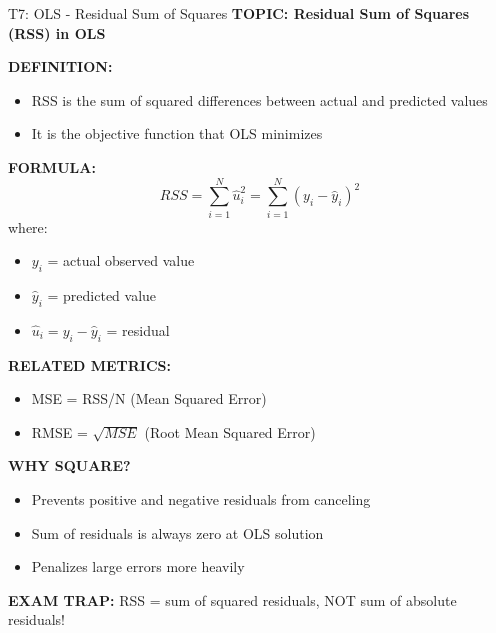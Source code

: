 \documentclass[8pt]{beamer}
\begin{document}
	\begin{frame}{T7: OLS - Residual Sum of Squares}
		\fontsize{6.5}{7.5}\selectfont
		\textbf{TOPIC: Residual Sum of Squares (RSS) in OLS}
		
		\vspace{0.1cm}
		\textbf{DEFINITION:}
		\begin{itemize}
			\item RSS is the sum of squared differences between actual and predicted values
			\item It is the objective function that OLS minimizes
		\end{itemize}
		
		\vspace{0.1cm}
		\textbf{FORMULA:}
		\[
		RSS = \sum_{i=1}^N \hat{u}_i^2 = \sum_{i=1}^N (y_i - \hat{y}_i)^2
		\]
		where:
		\begin{itemize}
			\item $y_i$ = actual observed value
			\item $\hat{y}_i$ = predicted value
			\item $\hat{u}_i = y_i - \hat{y}_i$ = residual
		\end{itemize}
		
		\vspace{0.1cm}
		\textbf{RELATED METRICS:}
		\begin{itemize}
			\item MSE = RSS/N (Mean Squared Error)
			\item RMSE = $\sqrt{MSE}$ (Root Mean Squared Error)
		\end{itemize}
		
		\vspace{0.1cm}
		\textbf{WHY SQUARE?}
		\begin{itemize}
			\item Prevents positive and negative residuals from canceling
			\item Sum of residuals is always zero at OLS solution
			\item Penalizes large errors more heavily
		\end{itemize}
		
		\textcolor{myred}{\textbf{EXAM TRAP:}} RSS = \textcolor{myblue}{sum of squared residuals}, NOT sum of absolute residuals!
	\end{frame}
	
\end{document}
